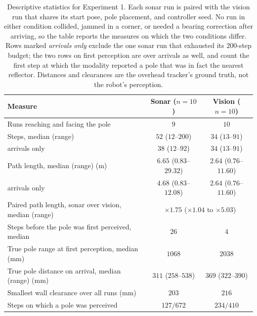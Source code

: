 \documentclass[11pt]{article}
\begin{document}
\begin{table}[ht]
	\centering
	\begin{tabular}{lcc}
		\hline
		\textbf{Measure} & \textbf{Sonar} ($n=10$) & \textbf{Vision} ($n=10$) \\
		\hline
		Runs reaching and facing the pole           & $9$ & $10$ \\
		Steps, median (range)                       & $52$ ($12$--$200$) & $34$ ($13$--$91$) \\
		\quad arrivals only                         & $38$ ($12$--$92$) & $34$ ($13$--$91$) \\
		Path length, median (range) (m)             & $6.65$ ($0.83$--$29.32$) & $2.64$ ($0.76$--$11.60$) \\
		\quad arrivals only                         & $4.68$ ($0.83$--$12.08$) & $2.64$ ($0.76$--$11.60$) \\
		Paired path length, sonar over vision, median (range) & \multicolumn{2}{c}{$\times 1.75$ ($\times 1.04$ to $\times 5.03$)} \\
		Steps before the pole was first perceived, median & $26$ & $4$ \\
		True pole range at first perception, median (mm)  & $1068$ & $2038$ \\
		True pole distance on arrival, median (range) (mm) & $311$ ($258$--$538$) & $369$ ($322$--$390$) \\
		Smallest wall clearance over all runs (mm)  & $203$ & $216$ \\
		Steps on which a pole was perceived         & $127 / 672$ & $234 / 410$ \\
		\hline
	\end{tabular}
	\caption{Descriptive statistics for Experiment 1. Each sonar run is paired with the vision run that shares its start pose, pole placement, and controller seed. No run in either condition collided, jammed in a corner, or needed a bearing correction after arriving, so the table reports the measures on which the two conditions differ. Rows marked \emph{arrivals only} exclude the one sonar run that exhausted its $200$-step budget; the two rows on first perception are over arrivals as well, and count the first step at which the modality reported a pole that was in fact the nearest reflector. Distances and clearances are the overhead tracker's ground truth, not the robot's perception.}
	\label{tab:direct-results}
\end{table}
\end{document}
